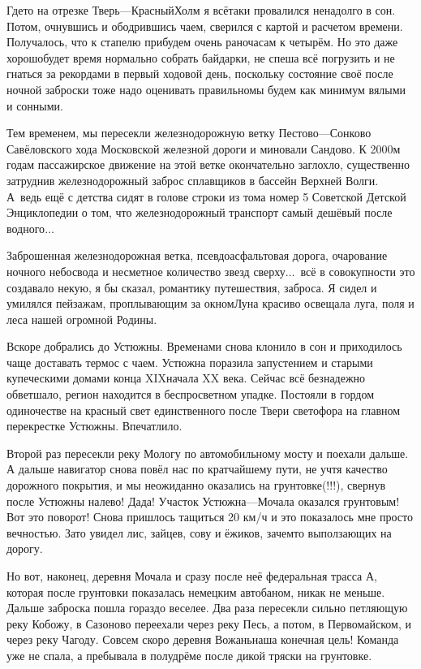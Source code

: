 Где\sdash то на отрезке Тверь\thinspace\nobreakdash---\thinspace Красный\thinspace Холм я всё\sdash таки провалился ненадолго в сон. Потом, очнувшись и ободрившись чаем, сверился с картой и расчетом времени. Получалось, что к стапелю прибудем очень рано\mdash часам к четырём. Но это даже хорошо\mdash будет время нормально собрать байдарки, не спеша всё погрузить и не гнаться за рекордами в первый ходовой день, поскольку состояние своё после ночной заброски тоже надо оценивать правильно\mdash мы будем как минимум вялыми и сонными. 

Тем временем, мы пересекли железнодорожную ветку Пестово\thinspace\nobreakdash---\thinspace Сонково Савёловского хода Московской железной дороги и миновали Сандово. К 2000\sdash м годам пассажирское движение на этой ветке окончательно заглохло, существенно затруднив железнодорожный заброс сплавщиков в бассейн Верхней Волги. А~ведь ещё с детства сидят в голове строки из тома номер 5 Советской Детской Энциклопедии о том, что железнодорожный транспорт самый дешёвый после водного$\ldots$ 

Заброшенная железнодорожная ветка, псевдоасфальтовая дорога, очарование ночного небосвода и несметное количество звезд сверху$\ldots$~всё в совокупности это создавало некую, я бы сказал, романтику путешествия, заброса. Я сидел и умилялся пейзажам, проплывающим за окном\mdash Луна красиво освещала луга, поля и леса нашей огромной Родины. 

Вскоре добрались до Устюжны. Временами снова клонило в сон и приходилось чаще доставать термос с чаем. Устюжна поразила запустением и старыми купеческими домами конца XIX\mdash начала XX века. Сейчас всё безнадежно обветшало, регион находится в беспросветном упадке. Постояли в гордом одиночестве на красный свет единственного после Твери светофора на главном перекрестке Устюжны. Впечатлило. 

Второй раз пересекли реку Мологу по автомобильному мосту и поехали дальше. А дальше навигатор снова повёл нас по кратчайшему пути, не учтя качество дорожного покрытия, и мы неожиданно оказались на грунтовке(!!!), свернув после Устюжны налево! Да\sdash да! Участок Устюжна\thinspace\nobreakdash---\thinspace Мочала оказался грунтовым! Вот это поворот! Снова пришлось тащиться 20 км/ч и это показалось мне просто вечностью. Зато увидел лис, зайцев, сову и ёжиков, зачем\sdash то выползающих на дорогу. 

Но вот, наконец, деревня Мочала и сразу после неё федеральная трасса А, которая после грунтовки показалась немецким автобаном, никак не меньше. Дальше заброска пошла гораздо веселее. Два раза пересекли сильно петляющую реку Кобожу, в Сазоново переехали через реку Песь, а потом, в Первомайском, и через реку Чагоду. Совсем скоро деревня Вожань\mdash наша конечная цель! Команда уже не спала, а пребывала в полудрёме после дикой тряски на грунтовке.

